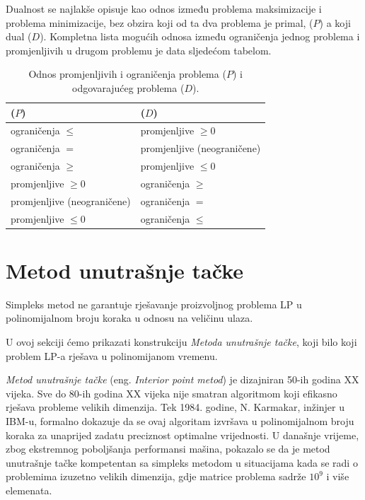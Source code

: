 \documentclass[a4paper, utf8, 11pt, colorlinks]{book}
\theoremstyle{definition}
\begin{document}
Dualnost se najlakše opisuje kao odnos između problema maksimizacije i problema minimizacije, bez obzira koji od ta dva problema je primal, ($P$) a koji   dual ($D$). 
Kompletna lista mogućih odnosa između ograničenja
jednog problema i promjenljivih u drugom problemu je data sljedećom tabelom.
\begin{table}[!ht]
	\centering
    \begin{tabular}{l|l}
      ($P$) & ($D$) \\ \hline
      ograničenja $\leq$  & promjenljive $\geq 0$ \\
      ograničenja $=$     & promjenljive (neograničene) \\
      ograničenja $\geq$  & promjenljive $\leq 0$ \\
      promjenljive $\geq 0$    & ograničenja $\geq$ \\
      promjenljive (neograničene) & ograničenja $=$ \\
      promjenljive $\leq 0$         & ograničenja $\leq$ \\ \hline
    \end{tabular}
  
    \caption{Odnos promjenljivih i ograničenja problema ($P$) i odgovarajućeg problema ($D$).}  \label{tab:primal-dual-relation}
\end{table}


\section{Metod unutrašnje tačke}

Simpleks metod ne garantuje   rješavanje proizvoljnog problema LP u polinomijalnom broju koraka u odnosu na veličinu ulaza. %

U ovoj sekciji ćemo prikazati konstrukciju  \emph{Metoda unutrašnje tačke}, koji  bilo koji problem LP-a rješava  u polinomijanom vremenu.


   \emph{Metod unutrašnje tačke} (eng. \emph{Interior point metod}) je dizajniran 50-ih godina XX vijeka. Sve do 80-ih godina XX vijeka nije smatran algoritmom koji efikasno  rješava probleme velikih dimenzija. Tek 1984. godine, N. Karmakar, inžinjer u IBM-u,  formalno dokazuje da se ovaj algoritam izvršava u polinomijalnom broju koraka za unaprijed zadatu preciznost optimalne vrijednosti. U današnje vrijeme, zbog ekstremnog poboljšanja performansi mašina, pokazalo se da je {metod unutrašnje tačke} kompetentan sa simpleks metodom u situacijama kada se radi o problemima izuzetno velikih dimenzija, gdje matrice problema sadrže $10^9$ i više elemenata.
\end{document}
